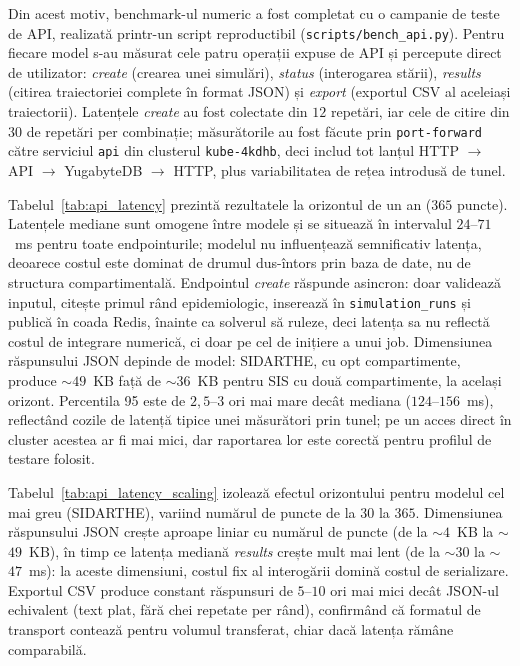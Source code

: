 Din acest motiv, benchmark-ul numeric a fost completat cu o campanie de teste de
API, realizată printr-un script reproductibil (\texttt{scripts/bench\_api.py}).
Pentru fiecare model s-au măsurat cele patru operații expuse de API și percepute
direct de utilizator: \emph{create} (crearea unei simulări), \emph{status}
(interogarea stării), \emph{results} (citirea traiectoriei complete în format
JSON) și \emph{export} (exportul CSV al aceleiași traiectorii). Latențele
\emph{create} au fost colectate din $12$ repetări, iar cele de citire din $30$ de
repetări per combinație; măsurătorile au fost făcute prin \texttt{port-forward}
către serviciul \texttt{api} din clusterul \texttt{kube-4kdhb}, deci includ tot
lanțul HTTP $\rightarrow$ API $\rightarrow$ YugabyteDB $\rightarrow$ HTTP, plus
variabilitatea de rețea introdusă de tunel.



Tabelul~\ref{tab:api_latency} prezintă rezultatele la orizontul de un an
($365$ puncte). Latențele mediane sunt omogene între modele și se situează
în intervalul $24$--$71$~ms pentru toate endpointurile; modelul nu
influențează semnificativ latența, deoarece costul este dominat de drumul
dus-întors prin baza de date, nu de structura compartimentală. Endpointul
\emph{create} răspunde asincron: doar validează inputul, citește primul
rând epidemiologic, inserează în \texttt{simulation\_runs} și publică în
coada Redis, înainte ca solverul să ruleze, deci latența sa nu reflectă
costul de integrare numerică, ci doar pe cel de inițiere a unui job.
Dimensiunea răspunsului JSON depinde de model: SIDARTHE, cu opt
compartimente, produce $\sim$$49$~KB față de $\sim$$36$~KB pentru SIS cu
două compartimente, la același orizont. Percentila 95 este de
$2{,}5$--$3$ ori mai mare decât mediana ($124$--$156$~ms), reflectând cozile
de latență tipice unei măsurători prin tunel; pe un acces direct în cluster
acestea ar fi mai mici, dar raportarea lor este corectă pentru profilul
de testare folosit.



Tabelul~\ref{tab:api_latency_scaling} izolează efectul orizontului pentru modelul
cel mai greu (SIDARTHE), variind numărul de puncte de la $30$ la $365$.
Dimensiunea răspunsului JSON crește aproape liniar cu numărul de puncte (de la
$\sim$$4$~KB la $\sim$$49$~KB), în timp ce latența mediană \emph{results} crește
mult mai lent (de la $\sim$$30$ la $\sim$$47$~ms): la aceste dimensiuni,
costul fix al interogării domină costul de serializare. Exportul CSV produce
constant răspunsuri de $5$--$10$ ori mai mici decât JSON-ul echivalent (text plat,
fără chei repetate per rând), confirmând că formatul de transport contează pentru
volumul transferat, chiar dacă latența rămâne comparabilă.


